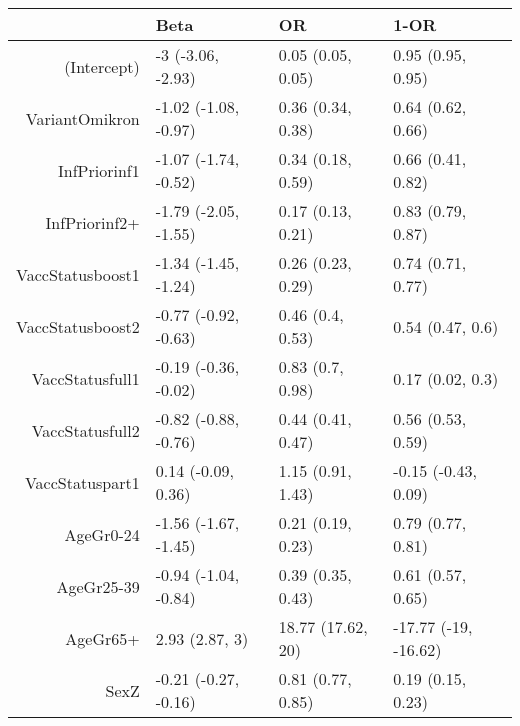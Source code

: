 \begin{table}[ht]
\centering
\begin{tabular}{rlll}
  \hline
 & Beta & OR & 1-OR \\ 
  \hline
(Intercept) & -3 (-3.06, -2.93) & 0.05 (0.05, 0.05) & 0.95 (0.95, 0.95) \\ 
  VariantOmikron & -1.02 (-1.08, -0.97) & 0.36 (0.34, 0.38) & 0.64 (0.62, 0.66) \\ 
  InfPriorinf1 & -1.07 (-1.74, -0.52) & 0.34 (0.18, 0.59) & 0.66 (0.41, 0.82) \\ 
  InfPriorinf2+ & -1.79 (-2.05, -1.55) & 0.17 (0.13, 0.21) & 0.83 (0.79, 0.87) \\ 
  VaccStatusboost1 & -1.34 (-1.45, -1.24) & 0.26 (0.23, 0.29) & 0.74 (0.71, 0.77) \\ 
  VaccStatusboost2 & -0.77 (-0.92, -0.63) & 0.46 (0.4, 0.53) & 0.54 (0.47, 0.6) \\ 
  VaccStatusfull1 & -0.19 (-0.36, -0.02) & 0.83 (0.7, 0.98) & 0.17 (0.02, 0.3) \\ 
  VaccStatusfull2 & -0.82 (-0.88, -0.76) & 0.44 (0.41, 0.47) & 0.56 (0.53, 0.59) \\ 
  VaccStatuspart1 & 0.14 (-0.09, 0.36) & 1.15 (0.91, 1.43) & -0.15 (-0.43, 0.09) \\ 
  AgeGr0-24 & -1.56 (-1.67, -1.45) & 0.21 (0.19, 0.23) & 0.79 (0.77, 0.81) \\ 
  AgeGr25-39 & -0.94 (-1.04, -0.84) & 0.39 (0.35, 0.43) & 0.61 (0.57, 0.65) \\ 
  AgeGr65+ & 2.93 (2.87, 3) & 18.77 (17.62, 20) & -17.77 (-19, -16.62) \\ 
  SexZ & -0.21 (-0.27, -0.16) & 0.81 (0.77, 0.85) & 0.19 (0.15, 0.23) \\ 
   \hline
\end{tabular}
\end{table}

